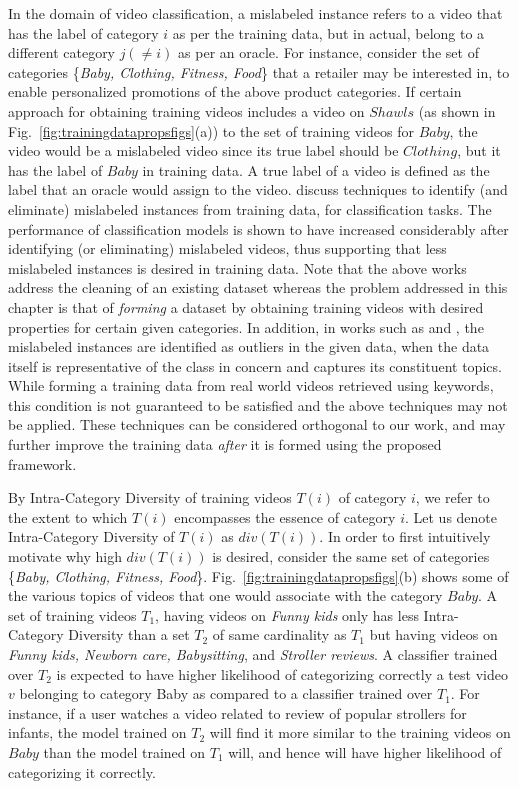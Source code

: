 In the domain of video classification, a mislabeled instance refers to a video that has the label of category $i$ as per the training data, but in actual, belong to a different category $j ( \neq i)$ as per an oracle. For instance, consider the set of categories \{\textit{Baby, Clothing, Fitness, Food}\} that a retailer may be interested in, to enable personalized promotions of the above product categories. If certain approach for obtaining training videos includes a video on $Shawls$ (as shown in Fig.~\ref{fig:trainingdatapropsfigs}(a)) to the set of training videos for $Baby$, the video would be a mislabeled video since its true label should be $Clothing$, but it has the label of $Baby$ in training data. A true label of a video is defined as the label that an oracle would assign to the video. \cite{brodley1996identifying,zhu2003eliminating} discuss techniques to identify (and eliminate) mislabeled instances from training data, for classification tasks. The performance of classification models is shown to have increased considerably after identifying (or eliminating) mislabeled videos, thus supporting that less mislabeled instances is desired in training data.  Note that the above works address the cleaning of an existing dataset whereas the problem addressed in this chapter is that of \textit{forming} a dataset by obtaining training videos with desired properties for certain given categories. In addition, in works such as \cite{brodley1996identifying} and \cite{zhu2003eliminating}, the mislabeled instances are identified as outliers in the given data, when the data itself is representative of the class in concern and captures its constituent topics. While forming a training data from real world videos retrieved using keywords, this condition is not guaranteed to be satisfied and the above techniques may not be applied. These techniques can be considered orthogonal to our work, and may further improve the training data \textit{after} it is formed using the proposed framework. 

By Intra-Category Diversity of training videos $T(i)$ of category $i$, we refer to the extent to which $T(i)$ encompasses the essence of category $i$. Let us denote Intra-Category Diversity of $T(i)$ as $div(T(i))$. In order to first intuitively motivate why high $div(T(i))$ is desired, consider the same set of categories \{\textit{Baby, Clothing, Fitness, Food}\}. Fig.~\ref{fig:trainingdatapropsfigs}(b) shows some of the various topics of videos that one would associate with the category $Baby$. A set of training videos $T_1$, having videos on \textit{Funny kids} only has less Intra-Category Diversity than a set $T_2$ of same cardinality as $T_1$ but having videos on \textit{Funny kids, Newborn care, Babysitting}, and \textit{Stroller reviews}. A classifier trained over $T_2$ is expected to have higher likelihood of categorizing correctly a test video $v$ belonging to category Baby as compared to a classifier trained over $T_1$. For instance, if a user watches a video related to review of popular strollers for infants, the model trained on $T_2$ will find it more similar to the training videos on $Baby$ than the model trained on $T_1$ will, and hence will have higher likelihood of categorizing it correctly. 

